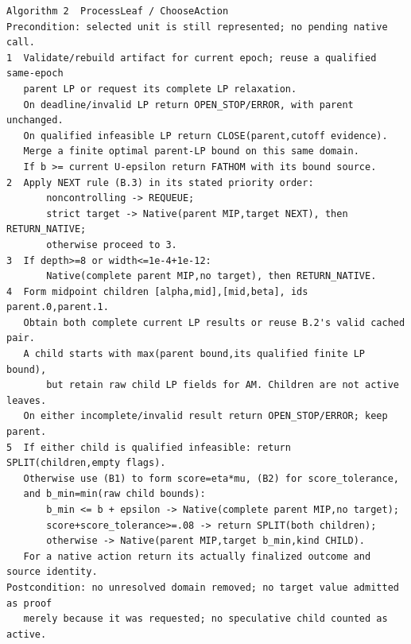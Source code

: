 \documentclass[
  american,
  11pt,
]{article}
\begin{document}
\par\medskip\noindent\begin{minipage}{\linewidth}

\begin{lstlisting}
Algorithm 2  ProcessLeaf / ChooseAction
Precondition: selected unit is still represented; no pending native call.
1  Validate/rebuild artifact for current epoch; reuse a qualified same-epoch
   parent LP or request its complete LP relaxation.
   On deadline/invalid LP return OPEN_STOP/ERROR, with parent unchanged.
   On qualified infeasible LP return CLOSE(parent,cutoff evidence).
   Merge a finite optimal parent-LP bound on this same domain.
   If b >= current U-epsilon return FATHOM with its bound source.
2  Apply NEXT rule (B.3) in its stated priority order:
       noncontrolling -> REQUEUE;
       strict target -> Native(parent MIP,target NEXT), then RETURN_NATIVE;
       otherwise proceed to 3.
3  If depth>=8 or width<=1e-4+1e-12:
       Native(complete parent MIP,no target), then RETURN_NATIVE.
4  Form midpoint children [alpha,mid],[mid,beta], ids parent.0,parent.1.
   Obtain both complete current LP results or reuse B.2's valid cached pair.
   A child starts with max(parent bound,its qualified finite LP bound),
       but retain raw child LP fields for AM. Children are not active leaves.
   On either incomplete/invalid result return OPEN_STOP/ERROR; keep parent.
5  If either child is qualified infeasible: return SPLIT(children,empty flags).
   Otherwise use (B1) to form score=eta*mu, (B2) for score_tolerance,
   and b_min=min(raw child bounds):
       b_min <= b + epsilon -> Native(complete parent MIP,no target);
       score+score_tolerance>=.08 -> return SPLIT(both children);
       otherwise -> Native(parent MIP,target b_min,kind CHILD).
   For a native action return its actually finalized outcome and source identity.
Postcondition: no unresolved domain removed; no target value admitted as proof
   merely because it was requested; no speculative child counted as active.
\end{lstlisting}

\end{minipage}\par\medskip
\end{document}
